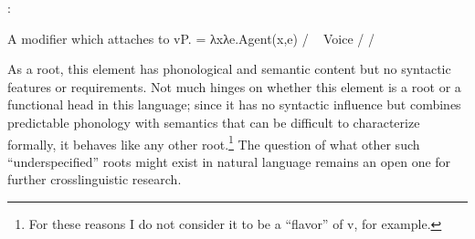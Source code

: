 \begin{exe}
\begin{xlist}
\begin{exe}
\begin{xlist}
\begin{exe}
\begin{xlist}
\begin{exe}
\begin{exe}
\begin{xlist}
\begin{exe}
\begin{xlist}
\begin{exe}
\begin{xlist}
\begin{exe}
\begin{xlist}
\begin{exe}
\begin{xlist}
\begin{exe}
\begin{xlist}
\begin{exe}
\begin{xlist}
\begin{exe}
\begin{xlist}
\begin{xlist}
\begin{exe}
\begin{xlist}
\begin{exe}
\begin{xlist}
\begin{exe}
\begin{xlist}
\begin{exe}
\begin{xlist}
\begin{exe}
\begin{xlist}
\begin{exe}
\begin{xlist}
\begin{exe}
\begin{xlist}
\begin{exe}
\begin{xlist}
\begin{exe}
\begin{xlist}
\begin{exe}
\begin{xlist}
\begin{exe}
\begin{xlist}
\begin{exe}
\begin{xlist}
\begin{xlist}
\begin{xlist}
\begin{exe}
\begin{xlist}
\begin{xlist}
\begin{xlist}
\begin{exe}
\begin{exe}
\begin{xlist}
\begin{exe}
\begin{xlist}
\begin{exe}
\begin{xlist}
\begin{exe}
\begin{xlist}
\begin{exe}
\begin{xlist}
\begin{exe}
\begin{xlist}
\begin{exe}
\begin{xlist}
\begin{exe}
\begin{exe}
\begin{xlist}
\begin{xlist}
\begin{exe}
\begin{xlist}
\begin{exe}
\begin{xlist}
\begin{exe}
\begin{xlist}
\begin{exe}
\begin{xlist}
 \begin{exe}
 \ex  {\va}: 
 \begin{xlist} 
 	\ex   A modifier which attaches to vP. 
 	\ex   {} = λxλe.Agent(x,e) / \trace~\va 
 	\ex   Voice {\lra} {\tpie} / {\trace} {\va} 
 	\ex   {\vz} {\lra} {\thit} / {\trace} {\va} 
 \z
\z 

As a root, this element has phonological and semantic content but no syntactic features or requirements. Not much hinges on whether this element is a root or a functional head in this language; since it has no syntactic influence but combines predictable phonology with semantics that can be difficult to characterize formally, it behaves like any other root.\footnote{For these reasons I do not consider it to be a ``flavor'' of v, for example.} The question of what other such ``underspecified'' roots might exist in natural language remains an open one for further crosslinguistic research.


\end{xlist}
\end{exe}
\end{xlist}
\end{exe}
\end{xlist}
\end{exe}
\end{xlist}
\end{exe}
\end{xlist}
\end{exe}
\end{xlist}
\end{xlist}
\end{exe}
\end{exe}
\end{xlist}
\end{exe}
\end{xlist}
\end{exe}
\end{xlist}
\end{exe}
\end{xlist}
\end{exe}
\end{xlist}
\end{exe}
\end{xlist}
\end{exe}
\end{xlist}
\end{exe}
\end{exe}
\end{xlist}
\end{xlist}
\end{xlist}
\end{exe}
\end{xlist}
\end{xlist}
\end{xlist}
\end{exe}
\end{xlist}
\end{exe}
\end{xlist}
\end{exe}
\end{xlist}
\end{exe}
\end{xlist}
\end{exe}
\end{xlist}
\end{exe}
\end{xlist}
\end{exe}
\end{xlist}
\end{exe}
\end{xlist}
\end{exe}
\end{xlist}
\end{exe}
\end{xlist}
\end{exe}
\end{xlist}
\end{exe}
\end{xlist}
\end{xlist}
\end{exe}
\end{xlist}
\end{exe}
\end{xlist}
\end{exe}
\end{xlist}
\end{exe}
\end{xlist}
\end{exe}
\end{xlist}
\end{exe}
\end{xlist}
\end{exe}
\end{xlist}
\end{exe}
\end{exe}
\end{xlist}
\end{exe}
\end{xlist}
\end{exe}
\end{xlist}
\end{exe}

